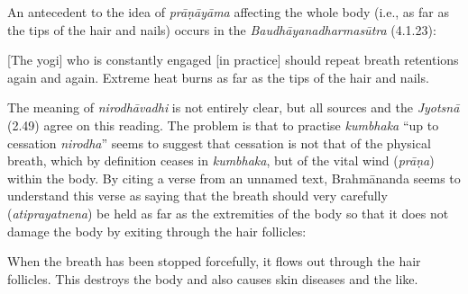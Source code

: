 \begin{ekdosis}
\begin{philcomm}[hp02_049]


An antecedent to the idea of \emph{prāṇāyāma} affecting the whole body (i.e., as far as the tips of the hair and nails) occurs in the \emph{Baudhāyanadharmasūtra} (4.1.23):

\begin{versinnote}
{}[The yogi] who is constantly engaged [in practice] should repeat breath retentions again and again. Extreme heat burns as far as the tips of the hair and nails. 
\end{versinnote}

\begin{versinnote}
\end{versinnote}

The meaning of \emph{nirodhāvadhi} is not entirely clear, but all sources and the \emph{Jyotsnā} (2.49) agree on this reading. The problem is that to practise \emph{kumbhaka} ``up to cessation \emph{nirodha}'' seems to suggest that cessation is not that of the physical breath, which by definition ceases in \emph{kumbhaka}, but of the vital wind (\emph{prāṇa}) within the body. By citing a verse from an unnamed text, Brahmānanda seems to understand this verse as saying that the breath should very carefully (\emph{atiprayatnena}) be held as far as the extremities of the body so that it does not damage the body by exiting through the hair follicles:


\begin{versinnote}
When the breath has been stopped forcefully, it flows out through the hair follicles. This destroys the body and also causes skin diseases and the like.
\end{versinnote}


\end{philcomm}
\end{ekdosis}

